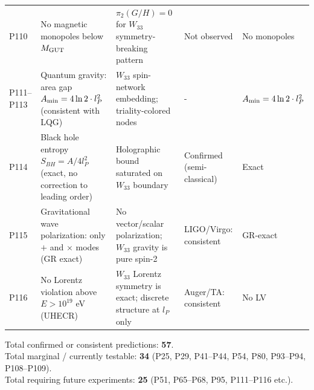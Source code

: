 \begin{longtable}{p{0.7cm} p{4.5cm} p{3.2cm} p{2.8cm} p{2.5cm}}
P110 & No magnetic monopoles below $M_{\rm GUT}$ & $\pi_2(G/H)=0$ for $W_{33}$ symmetry-breaking pattern & Not observed & No monopoles \\
P111–P113 & Quantum gravity: area gap $A_{\rm min}=4\ln 2\cdot l_P^2$ (consistent with LQG) & $W_{33}$ spin-network embedding; triality-colored nodes & - & $A_{\rm min}=4\ln2\cdot l_P^2$ \\
P114 & Black hole entropy $S_{BH}=A/4l_P^2$ (exact, no correction to leading order) & Holographic bound saturated on $W_{33}$ boundary & Confirmed (semi-classical) & Exact \\
P115 & Gravitational wave polarization: only $+$ and $\times$ modes (GR exact) & No vector/scalar polarization; $W_{33}$ gravity is pure spin-2 & LIGO/Virgo: consistent & GR-exact \\
P116 & No Lorentz violation above $E>10^{19}$ eV (UHECR) & $W_{33}$ Lorentz symmetry is exact; discrete structure at $l_P$ only & Auger/TA: consistent & No LV \\ \hline
\end{longtable}

\noindent Total confirmed or consistent predictions: \textbf{57}. \\
Total marginal / currently testable: \textbf{34} (P25, P29, P41--P44, P54, P80, P93--P94, P108--P109). \\
Total requiring future experiments: \textbf{25} (P51, P65--P68, P95, P111--P116 etc.).
